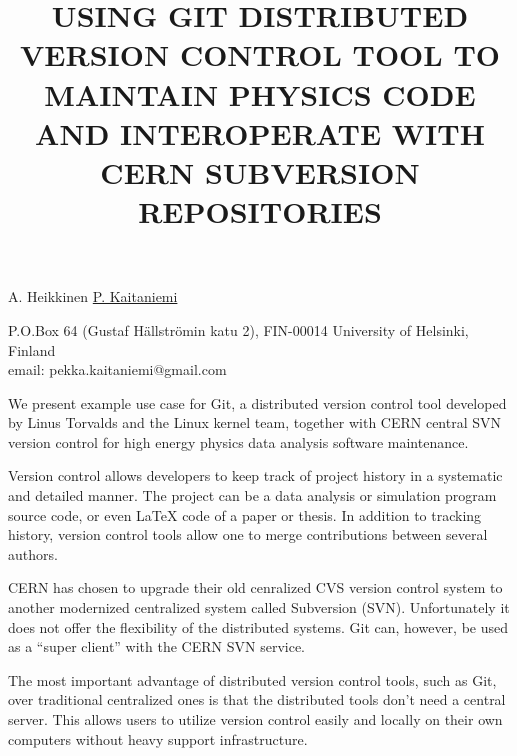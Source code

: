 \documentclass[12pt]{article}
\begin{document}
\title{USING GIT DISTRIBUTED VERSION CONTROL TOOL TO MAINTAIN PHYSICS
  CODE AND INTEROPERATE WITH CERN SUBVERSION REPOSITORIES}

A. Heikkinen \underline{P. Kaitaniemi}

P.O.Box 64 (Gustaf H\"allstr\"omin katu 2), FIN-00014 University of Helsinki, Finland\\
email: pekka.kaitaniemi@gmail.com

\vspace{\baselineskip}


We present example use case for Git, a distributed version control
tool developed by Linus Torvalds and the Linux kernel team, together
with CERN central SVN version control for high energy physics data
analysis software maintenance.

Version control allows developers to keep track of project history in
a systematic and detailed manner. The project can be a data analysis
or simulation program source code, or even LaTeX code of a paper or
thesis. In addition to tracking history, version control tools allow
one to merge contributions between several authors.

CERN has chosen to upgrade their old cenralized CVS version control
system to another modernized centralized system called Subversion
(SVN). Unfortunately it does not offer the flexibility of the
distributed systems. Git can, however, be used as a ``super client''
with the CERN SVN service.

The most important advantage of distributed version control tools,
such as Git, over traditional centralized ones is that the distributed
tools don't need a central server. This allows users to utilize
version control easily and locally on their own computers without
heavy support infrastructure.

\end{document}
